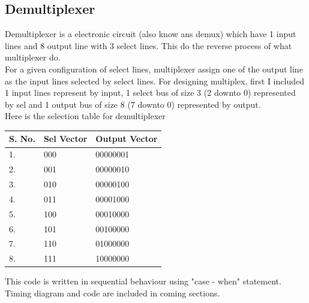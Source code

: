 \documentclass[12pt]{article}
\begin{document}
\subsection {Demultiplexer}
Demultiplexer is a electronic circuit (also know ans demux) which have 1 input lines and 8 output line with 3 select lines. This do the 
reverse process of what multiplexer do.\\
For a given configuration of select lines, multiplexer assign one of the output line as the input lines selected by select lines.
For designing multiplex, first I included 1 input lines represent by input, 1 select bus of size 3 (2 downto 0) represented by sel and 1 output bus of size 8 (7 downto 0) represented by output. \\
Here is the selection table for demultiplexer \\
\begin{center}
\begin{tabular}{| l | l | l | }
\hline
S. No. & Sel Vector & Output Vector\\ \hline
1. & 000 & 00000001 \\ \hline
2. & 001 & 00000010 \\ \hline
3. & 010 & 00000100 \\ \hline
4. & 011 & 00001000 \\ \hline
5. & 100 & 00010000 \\ \hline
6. & 101 & 00100000 \\ \hline
7. & 110 & 01000000 \\ \hline
8. & 111 & 10000000 \\ \hline
\end{tabular}
\end{center}
This code is written in sequential behaviour using "case - when" statement. Timing diagram and code are included in coming 
sections. 
\end{document}
